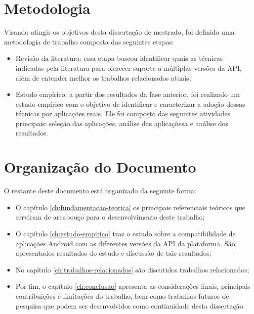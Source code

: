\section{Metodologia} \label{sec:metodologia}

Visando atingir os objetivos desta dissertação de mestrado, foi definido uma
metodologia de trabalho composta das seguintes etapas:
\begin{itemize}
	\item Revisão da literatura: essa etapa buscou identificar quais as técnicas
	indicadas pela literatura para oferecer suporte a múltiplas versões da API,
	além de entender melhor os trabalhos relacionados atuais;
	\item Estudo empírico: a partir dos resultados da fase anterior, foi realizado
	um estudo empírico com o objetivo de identificar e caracterizar a adoção dessas
	técnicas por aplicações reais. Ele foi composto das seguintes atividades principais:
	seleção das aplicações, análise das aplicaçõesa e análise dos resultados.
\end{itemize}


\section{Organização do Documento} \label{sec:organizacao-trabalho}

O restante deste documento está organizado da seguinte forma:
\begin{itemize}
    \item O capítulo \ref{ch:fundamentacao-teorica} os principais referenciais
    teóricos que serviram de arcabouço para o desenvolvimento deste trabalho;
    \item O capítulo \ref{ch:estudo-empirico}  traz o estudo sobre a compatibilidade
    de aplicações Android com as diferentes versões da API da plataforma. São
    apresentados resultados do estudo e discussão de tais resultados;
    \item No capítulo \ref{ch:trabalhos-relacionados} são discutidos trabalhos
    relacionados;
    \item Por fim, o capítulo \ref{ch:conclusao} apresenta as considerações finais,
    principais contribuições e limitações do trabalho, bem como trabalhos futuros
    de pesquisa que podem ser desenvolvidos como continuidade desta dissertação.
\end{itemize}

